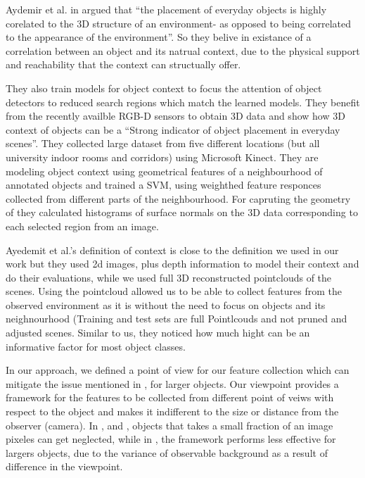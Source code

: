      
     Aydemir et al. in  \cite{aydemir2012_3Dcontext} argued that ``the placement of everyday objects is highly corelated to the 3D structure of an environment- as opposed to being correlated to the appearance of the environment''. So they belive in existance of a correlation between an object and its natrual context, due to the physical support and reachability that the context can structually offer. 
     
     They also train models for object context to focus the attention of object detectors to reduced search regions which match the learned models. They benefit from the recently availble RGB-D sensors to obtain 3D data and show how 3D context of objects can be a ``Strong indicator of object placement in everyday scenes''. They collected large dataset from five different locations (but all university indoor rooms and corridors) using Microsoft Kinect. They are modeling object context using geometrical features of a neighbourhood of annotated objects and trained a SVM, using weighthed feature responces collected from different parts of the neighbourhood. For capruting the geometry of they calculated histograms of surface normals on the 3D data corresponding to each selected region from an image.
     
     Ayedemit et al.'s definition of context is close to the definition we used in our work but they used 2d images, plus depth information to model their context and do their evaluations, while we used full 3D reconstructed pointclouds of the scenes. Using the pointcloud allowed us to be able to collect features from the observed environment as it is without the need to focus on objects and its neighnourhood (Training and test sets are full Pointlcouds and not pruned and adjusted scenes. Similar to us, they noticed how much hight can be an informative factor for most object classes. 
     
     In our approach, we defined a point of view for our feature collection which can mitigate the issue mentioned in \cite{aydemir2012_3Dcontext}, for larger objects. Our viewpoint provides a framework for the features to be collected from different point of veiws with respect to the object and makes it indifferent to the size or distance from the observer (camera). In \cite{TorralbaContextualPriming}, \cite{TrollbaContexBased} and \cite{PerkoLeonardisContextDriven}, objects that takes a small fraction of an image pixeles can get neglected, while in \cite{aydemir2012_3Dcontext}, the framework performs less effective for largers objects, due to the variance of observable background as a result of difference in the viewpoint. 
     

